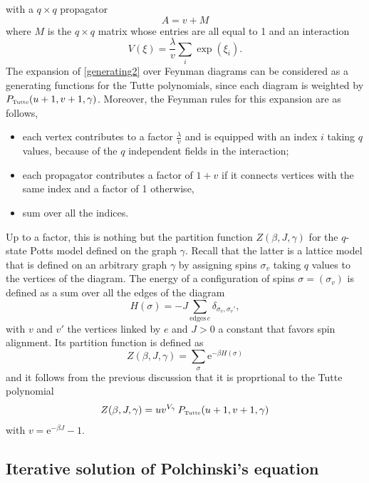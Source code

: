 \documentclass[12pt,here,feynmf]{article}
\begin{document}
with a $q\times q$ propagator
\begin{equation}
A=v+M
\end{equation}
where $M$ is the $q\times q$ matrix whose entries are all equal to 1 and an interaction
\begin{equation}
V(\xi)=\frac{\lambda}{v}\sum_{i}\exp(\xi_{i}).
\end{equation}
The expansion of \eqref{generating2} over Feynman diagrams can be considered as a generating functions for the Tutte polynomials, since each diagram is weighted by $P_{\mbox{\tiny Tutte}}(u+1,v+1,\gamma)$. Moreover, the Feynman rules for this expansion are as follows,  
\begin{itemize}
\item
each vertex contributes to a factor $\frac{\lambda}{v}$ and is equipped with an index $i$ taking $q$ values, because of the $q$ independent fields in the interaction; 
\item
each propagator contributes a factor of $1+v$ if it connects vertices with the same index and a factor of 1 otherwise,
\item
sum over all the indices. 
\end{itemize}
Up to a factor, this is  nothing but the partition function $Z(\beta,J,\gamma)$ for the $q$-state Potts model defined on the graph $\gamma$. Recall that the latter is a lattice model that is defined on an arbitrary graph $\gamma$ by assigning spins $\sigma_{v}$ taking $q$ values to the vertices of the diagram. The energy of a configuration of spins $\sigma=(\sigma_{v})$ is defined as a sum over all the edges of the diagram 
\begin{equation}
H(\sigma)=-J\sum_{\mathrm{edges}\,e}\delta_{\sigma_{v},\sigma_{v}'},
\end{equation} 
with $v$ and $v'$ the vertices linked by $e$ and $J>0$ a constant that favors spin alignment. Its partition function is defined as
\begin{equation}
Z(\beta,J,\gamma)=\sum_{\sigma}\mathrm{e}^{-\beta H(\sigma)}
\end{equation}
and it follows from the previous discussion that it is proprtional to the Tutte polynomial 
\begin{equation}
Z(\beta,J,\gamma)=uv^{V_\gamma}\,P_{\mbox{\tiny Tutte}}(u+1,v+1,\gamma)
\end{equation}
with $v=\mathrm{e}^{-\beta J}-1$.

 


\subsection{Iterative solution of Polchinski's equation}
\label{polchsec}
\end{document}
